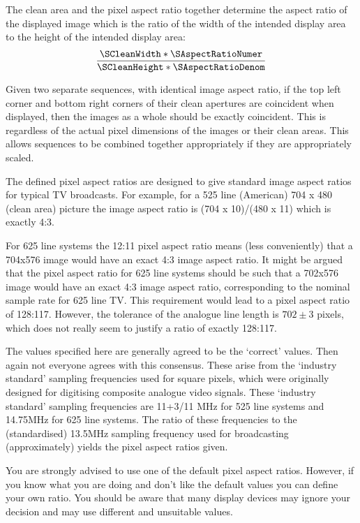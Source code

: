 \begin{informative*}
The clean area and the pixel aspect ratio together determine the
aspect ratio of the displayed image which is the ratio of the width of the intended
display area to the height of the intended display area:
\[\dfrac{\SCleanWidth*\SAspectRatioNumer}{\SCleanHeight*\SAspectRatioDenom}\]

Given two separate sequences, with identical image aspect ratio, if the
top left corner and bottom right corners of their clean apertures are
coincident when displayed, then the images as a whole should be exactly
coincident. This is regardless of the actual pixel dimensions of the
images or their clean areas. This allows sequences to be combined
together appropriately if they are appropriately scaled.

The defined pixel aspect ratios are designed to give standard image
aspect ratios for typical TV broadcasts. For example, for a 525 line
(American) 704 x 480 (clean area)  picture the image aspect ratio is
(704 x 10)/(480 x 11) which is exactly 4:3.

For 625 line systems the 12:11 pixel aspect ratio means (less
conveniently) that a 704x576 image would have an exact 4:3 image
aspect ratio. It might be argued that the pixel aspect ratio for 625
line systems should be such that a 702x576 image would have an exact 4:3
image aspect ratio, corresponding to the nominal sample rate for 625 line TV.
This requirement would lead to a
pixel aspect ratio of 128:117. However, the tolerance of the analogue
line length is $702\pm 3$ pixels, which does not really seem to justify a
ratio of exactly 128:117.

The values specified here are generally agreed to be the
`correct' values. Then again not everyone agrees with this
consensus. These arise from the `industry standard' sampling
frequencies used for square pixels, which were originally designed for
digitising composite analogue video signals. These `industry
standard' sampling frequencies are 11+3/11 MHz for 525 line systems
and 14.75MHz for 625 line systems. The ratio of these frequencies to the
(standardised) 13.5MHz sampling frequency used for broadcasting (approximately) 
yields the pixel aspect ratios given.

You are strongly advised to use one of the default pixel aspect ratios.
However, if you know what you are doing and don't like the default
values you can define your own ratio. You should be aware that many
display devices may ignore your decision and may use different and
unsuitable values. 

\end{informative*}